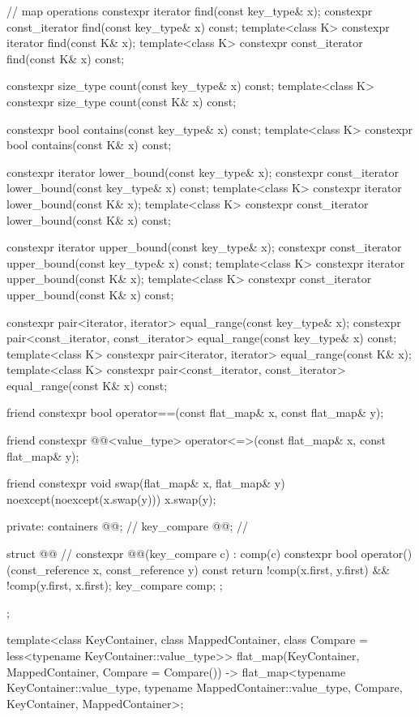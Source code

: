 \begin{codeblock}
{{    // map operations
    constexpr iterator find(const key_type& x);
    constexpr const_iterator find(const key_type& x) const;
    template<class K> constexpr iterator find(const K& x);
    template<class K> constexpr const_iterator find(const K& x) const;

    constexpr size_type count(const key_type& x) const;
    template<class K> constexpr size_type count(const K& x) const;

    constexpr bool contains(const key_type& x) const;
    template<class K> constexpr bool contains(const K& x) const;

    constexpr iterator lower_bound(const key_type& x);
    constexpr const_iterator lower_bound(const key_type& x) const;
    template<class K> constexpr iterator lower_bound(const K& x);
    template<class K> constexpr const_iterator lower_bound(const K& x) const;

    constexpr iterator upper_bound(const key_type& x);
    constexpr const_iterator upper_bound(const key_type& x) const;
    template<class K> constexpr iterator upper_bound(const K& x);
    template<class K> constexpr const_iterator upper_bound(const K& x) const;

    constexpr pair<iterator, iterator> equal_range(const key_type& x);
    constexpr pair<const_iterator, const_iterator> equal_range(const key_type& x) const;
    template<class K> constexpr pair<iterator, iterator> equal_range(const K& x);
    template<class K>
      constexpr pair<const_iterator, const_iterator> equal_range(const K& x) const;

    friend constexpr bool operator==(const flat_map& x, const flat_map& y);

    friend constexpr @@<value_type>
      operator<=>(const flat_map& x, const flat_map& y);

    friend constexpr void swap(flat_map& x, flat_map& y) noexcept(noexcept(x.swap(y)))
      { x.swap(y); }

  private:
    containers @@;               // \expos
    key_compare @@;        // \expos

    struct @@ {  // \expos
      constexpr @@(key_compare c) : comp(c) { }
      constexpr bool operator()(const_reference x, const_reference y) const {
        return !comp(x.first, y.first) && !comp(y.first, x.first);
      }
      key_compare comp;
    };
  };

  template<class KeyContainer, class MappedContainer,
           class Compare = less<typename KeyContainer::value_type>>
    flat_map(KeyContainer, MappedContainer, Compare = Compare())
      -> flat_map<typename KeyContainer::value_type, typename MappedContainer::value_type,
                  Compare, KeyContainer, MappedContainer>;

}
\end{codeblock}
